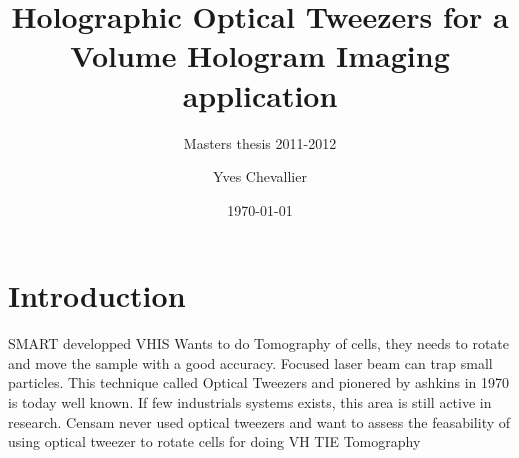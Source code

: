 \documentclass{kepfl}
\begin{document}
\date     {\today}
\author   {Yves Chevallier}
\title    {Holographic Optical Tweezers for a \\Volume Hologram Imaging application}
\subtitle {Masters thesis 2011-2012}
\maketitle
\newpage

\frontmatter 

\begin{acknowledgements}
	
\end{acknowledgements}
\clearemptydoublepage

\begin{abstract}
	\lipsum[1]

	\vspace{1em}
	\asterism
	\vspace{1em}

	\lipsum[2]
\end{abstract}

\clearemptydoublepage
\tableofcontents
\clearemptydoublepage
{}

\mainmatter
\chapter{Introduction}
SMART developped VHIS 
Wants to do Tomography of cells, they needs to rotate and move the sample with a good accuracy. 
Focused laser beam can trap small particles. This technique called Optical Tweezers and pionered by ashkins in 1970 is today well known. 
If few industrials systems exists, this area is still active in research. 
Censam never used optical tweezers and want to assess the feasability of using optical tweezer to rotate cells for doing VH TIE Tomography
\end{document}
